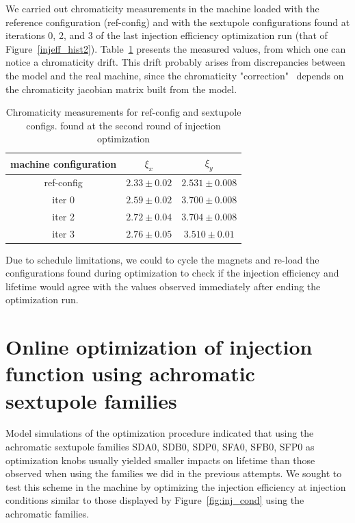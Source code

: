 \documentclass[a4paper,11pt]{article}
\begin{document}
We carried out chromaticity measurements in the machine loaded with the reference configuration (ref-config) and with the sextupole configurations found at iterations 0, 2, and 3 of the last injection efficiency optimization run
(that of Figure~\ref{injeff_hist2}). Table~\ref{chrom} presents the measured values, from which one can notice a chromaticity drift. This drift probably arises from discrepancies between the model and the real machine, since the chromaticity "correction"~ depends on the chromaticity jacobian matrix built from the model.
\begin{table}[h]
\centering
\begin{tabular}{@{}ccc@{}}
\toprule
machine configuration & $\xi_x$       & $\xi_y$         \\ \midrule
ref-config   & $2.33\pm0.02$ & $2.531\pm0.008$ \\
iter 0   & $2.59\pm0.02$ & $3.700\pm0.008$   \\
iter 2   & $2.72\pm0.04$ & $3.704\pm0.008$ \\
iter 3   & $2.76\pm0.05$  & $3.510\pm0.01$   \\ \bottomrule
\end{tabular}
\caption{Chromaticity measurements for ref-config and sextupole configs. found at the second round of injection optimization}
\label{chrom}
\end{table}
Due to schedule limitations, we could to cycle the magnets and re-load the configurations found during optimization to check if the injection efficiency and lifetime would agree with the values observed immediately after ending the optimization run.


\section{Online optimization of injection function using achromatic sextupole families}
Model simulations of the optimization procedure indicated that using the achromatic sextupole families SDA0, SDB0, SDP0, SFA0, SFB0, SFP0 as optimization knobs usually yielded smaller impacts on lifetime  than those observed when using the families we did in the previous attempts. We sought to test this scheme in the machine by optimizing the injection efficiency at injection conditions similar to those displayed by Figure~\ref{fig:inj_cond} using the achromatic families.
\end{document}
